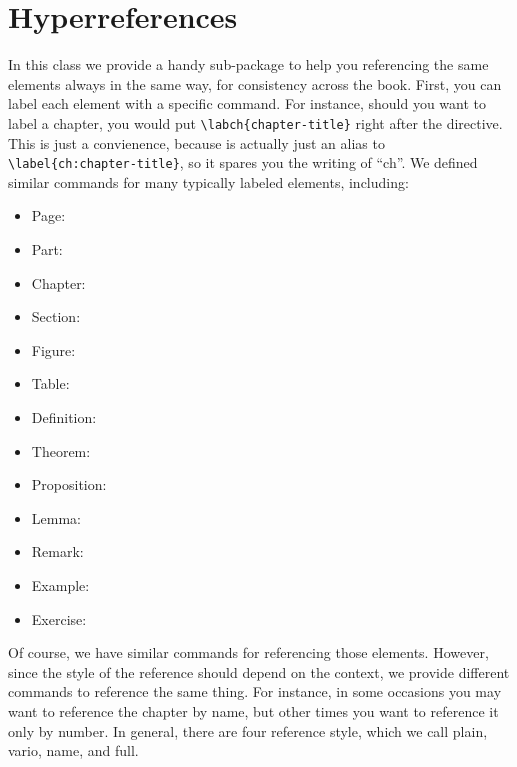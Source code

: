 \section{Hyperreferences}

In this class we provide a handy sub-package to help you referencing the 
same elements always in the same way, for consistency across the book. 
First, you can label each element with a specific command. For instance, 
should you want to label a chapter, you would put 
\lstinline|\labch{chapter-title}| right after the  
directive. This is just a convienence, because  is 
actually just an alias to \lstinline|\label{ch:chapter-title}|, so it 
spares you the writing of \enquote{ch}. We defined similar commands for 
many typically labeled elements, including:

\begin{multicols}{2}
\setlength{\columnseprule}{0pt}
\begin{itemize}
	\item Page: 
	\item Part: 
	\item Chapter: 
	\item Section: 
	\item Figure: 
	\item Table: 
	\item Definition: 
	\item Theorem: 
	\item Proposition: 
	\item Lemma: 
	\item Remark: 
	\item Example: 
	\item Exercise: 
\end{itemize}
\end{multicols}

Of course, we have similar commands for referencing those elements. 
However, since the style of the reference should depend on the context, 
we provide different commands to reference the same thing. For instance, 
in some occasions you may want to reference the chapter by name, but 
other times you want to reference it only by number. In general, there 
are four reference style, which we call plain, vario, name, and full. 

